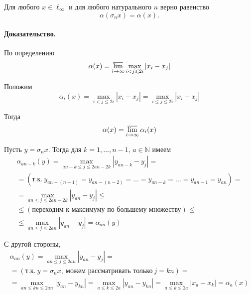 \begin{theorem}
	Для любого $x\in\ell_\infty$ и для любого натурального $n$ верно равенство
	\begin{equation}
		\alpha(\sigma_n x) = \alpha(x)
		.
	\end{equation}
\end{theorem}

\paragraph{Доказательство.}
По определению
\begin{equation}
	\alpha(x) = \varlimsup_{i\to\infty} \max_{i<j\leqslant 2i} |x_i - x_j|
\end{equation}

Положим
\begin{equation}
	\alpha_i(x) =
	\max_{i<j\leqslant 2i} |x_i - x_j| =
	\max_{i\leqslant j\leqslant 2i} |x_i - x_j|
\end{equation}

Тогда
\begin{equation}
	\alpha(x) = \varlimsup_{i\to\infty} \alpha_i(x)
\end{equation}

Пусть $y = \sigma_n x$.
Тогда для $k=1, ..., n-1$, $a\in\mathbb{N}$ имеем
\begin{multline}
	\alpha_{an-k}(y) =
	\max_{an-k \leqslant j \leqslant 2an-2k} |y_{an-k} - y_j| =
	\\=
	(\mbox{т.к.}~y_{an-(n-1)}=y_{an-(n-2)}=...=y_{an-k}=...=y_{an-1}=y_{an})=
	\\=
	\max_{an \leqslant j \leqslant 2an-2k} |y_{an} - y_j| \leqslant
	\\ \leqslant
	(\mbox{переходим к максимуму по большему множеству}) \leqslant
	\\ \leqslant
	\max_{an \leqslant j \leqslant 2an} |y_{an} - y_j| =
	\alpha_{an}(y)
\end{multline}

С другой стороны,
\begin{multline}
	\alpha_{an}(y) =
	\max_{an \leqslant j \leqslant 2an} |y_{an} - y_j| =
	\\ =
	(\mbox{т.к.}~y=\sigma_n x,~\mbox{можем рассматривать только}~j=kn)=
	\\ =
	\max_{an \leqslant kn \leqslant 2an} |y_{an} - y_{kn}| =
	\max_{a \leqslant k \leqslant 2a} |y_{an} - y_{kn}| =
	\max_{a \leqslant k \leqslant 2a} |x_a - x_k| =
	\alpha_a(x)
\end{multline}

